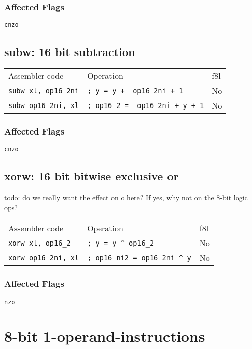 \documentclass{book}
\begin{document}
\subsubsection*{Affected Flags}

\texttt{cnzo}


\subsection{subw: 16 bit subtraction}

\begin{tabular}{l l l}
Assembler code              & Operation                               & f8l \\
\texttt{subw xl, op16\_2ni} & \texttt{; y = y + ~op16\_2ni + 1}       & No \\
\texttt{subw op16\_2ni, xl} & \texttt{; op16\_2 = ~op16\_2ni + y + 1} & No
\end{tabular}

\subsubsection*{Affected Flags}

\texttt{cnzo}


\subsection{xorw: 16 bit bitwise exclusive or}

todo: do we really want the effect on o here? If yes, why not on the 8-bit logic ops?

\begin{tabular}{l l l}
Assembler code              & Operation                               & f8l \\
\texttt{xorw xl, op16\_2}   & \texttt{; y = y \^{} op16\_2}           & No \\
\texttt{xorw op16\_2ni, xl} & \texttt{; op16\_ni2 = op16\_2ni \^{} y} & No
\end{tabular}

\subsubsection*{Affected Flags}

\texttt{nzo}


\section{8-bit 1-operand-instructions}
\end{document}
